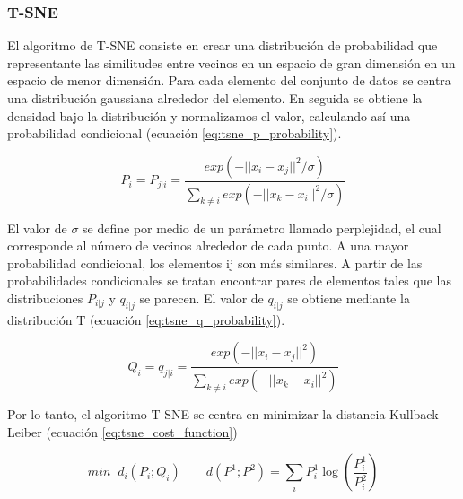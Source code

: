 \subsubsection{T-SNE \label{sec:tsne}}

El algoritmo de T-SNE consiste en crear una distribución de probabilidad que representante las similitudes entre vecinos en un espacio de gran dimensión en un espacio de menor dimensión. Para cada elemento del conjunto de datos se centra una distribución gaussiana alrededor del elemento. En seguida se obtiene la densidad bajo la distribución y normalizamos el valor, calculando así una probabilidad condicional (ecuación \ref{eq:tsne_p_probability}).

\begin{equation}
	P_i=P_{j|i} = \frac{exp(-||x_i-x_j||^2/\sigma)}{\sum\limits_{k\neq i} exp(-||x_k-x_i||^2/\sigma)} \label{eq:tsne_p_probability}
\end{equation}

El valor de $\sigma$ se define por medio de un parámetro llamado perplejidad, el cual corresponde al número de vecinos alrededor de cada punto. A una mayor probabilidad condicional, los elementos ij son más similares. A partir de las probabilidades condicionales se tratan encontrar pares de elementos tales que las distribuciones $P_{i|j}$ y $q_{i|j}$ se parecen. El valor de $q_{i|j}$ se obtiene mediante la distribución T (ecuación \ref{eq:tsne_q_probability}).

\begin{equation}
	Q_i=q_{j|i} = \frac{exp(-||x_i-x_j||^2)}{\sum\limits_{k\neq i} exp(-||x_k-x_i||^2)} \label{eq:tsne_q_probability}
\end{equation}

Por lo tanto, el algoritmo T-SNE se centra en minimizar la distancia Kullback-Leiber (ecuación \ref{eq:tsne_cost_function})

\begin{equation}
	min\;\; d_i (P_i;Q_i) \qquad d(P^1;P^2) = \sum_i P_i^1 \log \left(\frac{P^1_i}{P^2_i} \right)
	\label{eq:tsne_cost_function}
\end{equation}

